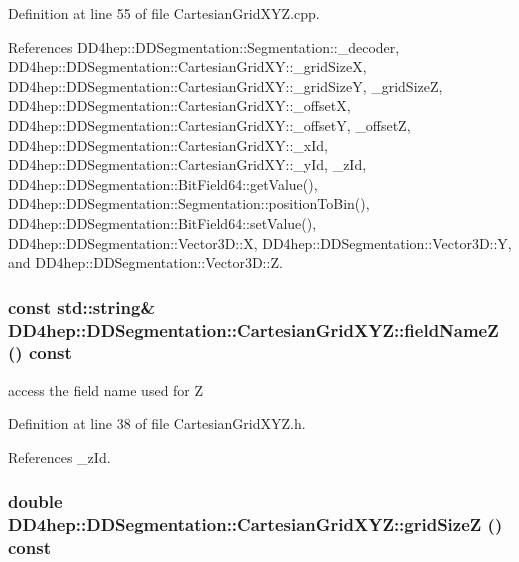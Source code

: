 Definition at line 55 of file CartesianGridXYZ.cpp.

References DD4hep::DDSegmentation::Segmentation::\_\-decoder, DD4hep::DDSegmentation::CartesianGridXY::\_\-gridSizeX, DD4hep::DDSegmentation::CartesianGridXY::\_\-gridSizeY, \_\-gridSizeZ, DD4hep::DDSegmentation::CartesianGridXY::\_\-offsetX, DD4hep::DDSegmentation::CartesianGridXY::\_\-offsetY, \_\-offsetZ, DD4hep::DDSegmentation::CartesianGridXY::\_\-xId, DD4hep::DDSegmentation::CartesianGridXY::\_\-yId, \_\-zId, DD4hep::DDSegmentation::BitField64::getValue(), DD4hep::DDSegmentation::Segmentation::positionToBin(), DD4hep::DDSegmentation::BitField64::setValue(), DD4hep::DDSegmentation::Vector3D::X, DD4hep::DDSegmentation::Vector3D::Y, and DD4hep::DDSegmentation::Vector3D::Z.\hypertarget{class_d_d4hep_1_1_d_d_segmentation_1_1_cartesian_grid_x_y_z_ab761fdf829436e7be5089a3638227e87}{
\subsubsection[{fieldNameZ}]{\setlength{\rightskip}{0pt plus 5cm}const std::string\& DD4hep::DDSegmentation::CartesianGridXYZ::fieldNameZ () const}}
\label{class_d_d4hep_1_1_d_d_segmentation_1_1_cartesian_grid_x_y_z_ab761fdf829436e7be5089a3638227e87}


access the field name used for Z 

Definition at line 38 of file CartesianGridXYZ.h.

References \_\-zId.\hypertarget{class_d_d4hep_1_1_d_d_segmentation_1_1_cartesian_grid_x_y_z_ac9b1044765b985e8505bd84880fab38b}{
\subsubsection[{gridSizeZ}]{\setlength{\rightskip}{0pt plus 5cm}double DD4hep::DDSegmentation::CartesianGridXYZ::gridSizeZ () const}}
\label{class_d_d4hep_1_1_d_d_segmentation_1_1_cartesian_grid_x_y_z_ac9b1044765b985e8505bd84880fab38b}



